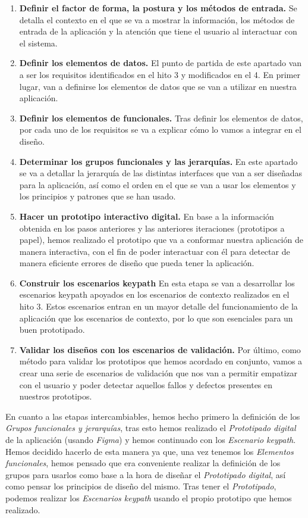 \begin{enumerate}
    \item \textbf{Definir el factor de forma, la postura y los métodos de entrada.} Se detalla el contexto en el que se va a mostrar la información, los
    métodos de entrada de la aplicación y la atención que tiene el usuario al interactuar con el sistema.
    \item \textbf{Definir los elementos de datos.} El punto de partida de este apartado van a ser los requisitos identificados en el hito 3 y modificados en el 4.
    En primer lugar, van a definirse los elementos de datos que se van a utilizar en nuestra aplicación.
    \item \textbf{Definir los elementos de funcionales.} Tras definir los elementos de datos, por cada uno de los requisitos se va a explicar cómo lo vamos a integrar en el diseño.
    \item \textbf{Determinar los grupos funcionales y las jerarquías.} En este apartado se va a detallar la jerarquía de las distintas interfaces que van a 
    ser diseñadas para la aplicación, así como el orden en el que se van a usar los elementos y los principios y patrones que se han usado.
    \item \textbf{Hacer un prototipo interactivo digital.} En base a la información obtenida en los pasos anteriores y las anteriores iteraciones (prototipos a papel), hemos realizado
    el prototipo que va a conformar nuestra aplicación de manera interactiva, con el fin de poder interactuar con él para detectar de manera eficiente errores de diseño que pueda
    tener la aplicación.
    \item \textbf{Construir los escenarios keypath} En esta etapa se van a desarrollar los escenarios keypath apoyados en los escenarios de contexto realizados
    en el hito 3. Estos escenarios entran en un mayor detalle del funcionamiento de la aplicación que los escenarios de contexto, por lo que son esenciales para
    un buen prototipado.
    \item \textbf{Validar los diseños con los escenarios de validación.} Por último, como método para validar los prototipos que hemos acordado en conjunto,
    vamos a crear una serie de escenarios de validación que nos van a permitir empatizar con el usuario y poder detectar aquellos fallos y defectos presentes en nuestros
    prototipos.
\end{enumerate}

En cuanto a las etapas intercambiables, hemos hecho primero la definición de los \textit{Grupos
funcionales y jerarquías}, tras esto hemos realizado el \textit{Prototipado digital} de la aplicación
(usando \textit{Figma}) y hemos continuado con los \textit{Escenario keypath}. Hemos decidido hacerlo
de esta manera ya que, una vez tenemos los \textit{Elementos funcionales}, hemos pensado que era conveniente
realizar la definición de los grupos para usarlos como base a la hora de diseñar el \textit{Prototipado digital},
así como pensar los principios de diseño del mismo. Tras tener el \textit{Prototipado}, podemos realizar los
\textit{Escenarios keypath} usando el propio prototipo que hemos realizado.